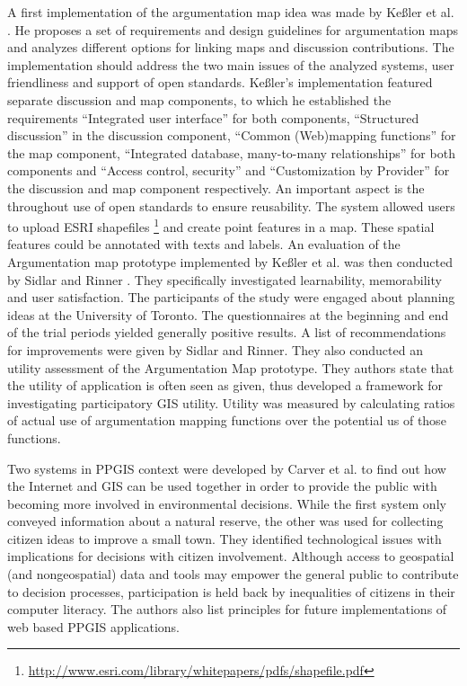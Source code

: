 A first implementation of the argumentation map idea was made by Ke{\ss}ler et al. \cite{Kessler2005_ArgumentationMapPrototype}. He proposes a set of requirements and design guidelines for argumentation maps and analyzes different options for linking maps and discussion contributions. The implementation should address the two main issues of the analyzed systems, user friendliness and support of open standards. Ke{\ss}ler's implementation featured separate discussion and map components, to which he established the requirements ``Integrated user interface'' for both components, ``Structured discussion'' in the discussion component, ``Common (Web)mapping functions'' for the map component, ``Integrated database, many-to-many relationships'' for both components and ``Access control, security'' and ``Customization by Provider'' for the discussion and map component respectively. An important aspect is the throughout use of open standards to ensure reusability. The system allowed users to upload ESRI shapefiles \footnote{\url{http://www.esri.com/library/whitepapers/pdfs/shapefile.pdf}} and create point features in a map. These spatial features could be annotated with texts and labels. An evaluation of the Argumentation map prototype implemented by Ke{\ss}ler et al. was then conducted by Sidlar and Rinner \cite{sidlar_argumap_2007}. They specifically investigated learnability, memorability and user satisfaction. The participants of the study were engaged about planning ideas at the University of Toronto. The questionnaires at the beginning and end of the trial periods yielded generally positive results. A list of recommendations for improvements were given by Sidlar and Rinner. They also conducted an utility assessment \cite{Sidlar2009 AssessmentMapGeocollaborationTool} of the Argumentation Map prototype. They authors state that the utility of application is often seen as given, thus developed a framework for investigating participatory GIS utility. Utility was measured by calculating ratios of actual use of argumentation mapping functions over the potential us of those functions.


Two systems in PPGIS context were developed by Carver et al. \cite{Carver2001_PPGIS_Cyberdemocracy} to find out how the Internet and GIS can be used together in order to provide the public with becoming more involved in environmental decisions. While the first system only conveyed information about a natural reserve, the other was used for collecting citizen ideas to improve a small town. They identified technological issues with implications for decisions with citizen involvement. Although access to geospatial (and nongeospatial) data and tools may empower the general public to contribute to decision processes, participation is held back by inequalities of citizens in their computer literacy. The authors also list principles for future implementations of web based PPGIS applications.


